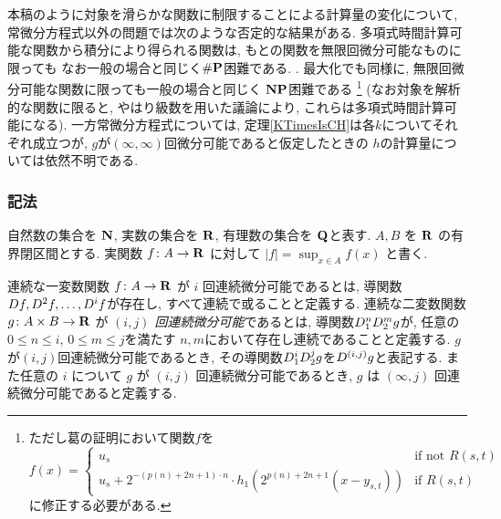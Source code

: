 本稿のように対象を滑らかな関数に制限することによる計算量の変化について,
常微分方程式以外の問題では次のような否定的な結果がある.
多項式時間計算可能な関数から積分により得られる関数は, 
もとの関数を無限回微分可能なものに限っても
なお一般の場合と同じく$\mathbf{\#P}$困難である. 
\cite[定理5.33]{ko1991complexity}.
最大化でも同様に, 
無限回微分可能な関数に限っても一般の場合と同じく
$\mathbf{NP}$困難である
\footnote{%
ただし葛\cite[定理3.7]{ko1991complexity}の証明において関数$f$を
\[f(x) = 
\begin{cases}
 u_s & \text{if not } R(s,t) \\
 u_s + 2^{-(p(n)+2n+1)\cdot n} \cdot h_1(2^{p(n)+2n+1} (x - y_{s,t})) & \text{if } R(s,t)
\end{cases}\]
に修正する必要がある.
}\cite[定理3.7]{ko1991complexity}
(なお対象を解析的な関数に限ると, 
やはり級数を用いた議論により, 
これらは多項式時間計算可能になる). 
一方常微分方程式については, 
定理\ref{KTimesIsCH}は各$k$についてそれぞれ成立つが, 
$g$が$(\infty, \infty)$回微分可能であると仮定したときの
$h$の計算量については依然不明である. 

\subsubsection*{記法}
自然数の集合を $\mathbf N$, 実数の集合を $\mathbf R$, 
有理数の集合を $\mathbf Q$と表す.
$A, B$ を $\mathbf R$ の有界閉区間とする. 
実関数 $f \colon A \to \mathbf R$ に対して $|f| = \sup_{x \in A} f(x)$ と書く.

連続な一変数関数 $f\colon A \to \mathbf R$ が $i$ 回連続微分可能であるとは,
導関数$D f, D^2 f, \dots, D^i f$が存在し, すべて連続で或ることと定義する.
連続な二変数関数 $g \colon A \times B \to \mathbf R$ が
\emph{$(i, j)$ 回連続微分可能}であるとは,
導関数$D_1^n D_2^m g$が, 任意の$0 \le n \le i$, $0 \le m \le j$を満たす
$n,m$において存在し連続であることと定義する.
$g$が$(i,j)$回連続微分可能であるとき,
その導関数$D_1^i D_2^j g$を$D^{(i,j)}g$と表記する.
また任意の $i$ について $g$ が $(i, j)$ 回連続微分可能であるとき,
$g$ は $(\infty, j)$ 回連続微分可能であると定義する.
